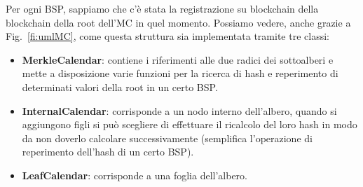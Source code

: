 Per ogni BSP, sappiamo che c'è stata la registrazione su blockchain della blockchain
della root dell'MC in quel momento.
Possiamo vedere, anche grazie a Fig.~\ref{fi:umlMC}, come questa struttura sia implementata tramite tre classi:

\begin{itemize}
    \item \textbf{MerkleCalendar}: contiene i riferimenti alle due radici dei sottoalberi e mette a disposizione varie funzioni per la ricerca di hash e reperimento di determinati valori della root in un certo BSP.
    \item \textbf{InternalCalendar}: corrisponde a un nodo interno dell'albero, quando si aggiungono figli si può scegliere di effettuare il ricalcolo del loro hash in modo da non doverlo calcolare successivamente (semplifica l'operazione di reperimento dell'hash di un certo BSP).
    \item \textbf{LeafCalendar}: corrisponde a una foglia dell'albero.
\end{itemize}


